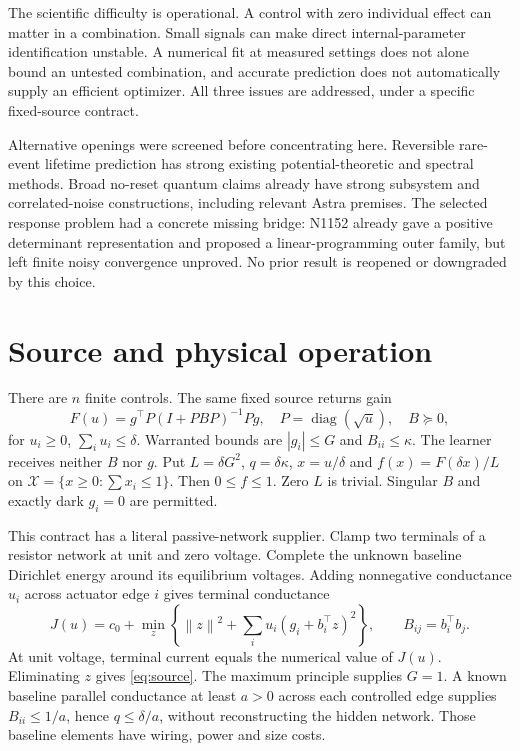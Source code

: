 \documentclass[10pt,a4paper]{article}
\newcommand{\X}{\mathcal X}
\newcommand{\norm}[1]{\left\lVert#1\right\rVert}
\begin{document}
The scientific difficulty is operational. A control with zero individual effect
can matter in a combination. Small signals can make direct internal-parameter
identification unstable. A numerical fit at measured settings does not alone
bound an untested combination, and accurate prediction does not automatically
supply an efficient optimizer. All three issues are addressed, under a specific
fixed-source contract.

Alternative openings were screened before concentrating here. Reversible
rare-event lifetime prediction has strong existing potential-theoretic and
spectral methods. Broad no-reset quantum claims already have strong subsystem
and correlated-noise constructions, including relevant Astra premises. The
selected response problem had a concrete missing bridge: N1152 already gave a
positive determinant representation and proposed a linear-programming outer
family, but left finite noisy convergence unproved. No prior result is reopened
or downgraded by this choice.

\section{Source and physical operation}

There are $n$ finite controls. The same fixed source returns gain
\begin{equation}
 F(u)=g^\top P(I+PBP)^{-1}Pg,\quad P=\operatorname{diag}(\sqrt u),\quad
 B\succeq0,
 \label{eq:source}
\end{equation}
for $u_i\ge0$, $\sum_i u_i\le\delta$. Warranted bounds are
$|g_i|\le G$ and $B_{ii}\le\kappa$. The learner receives neither $B$ nor $g$.
Put $L=\delta G^2$, $q=\delta\kappa$, $x=u/\delta$ and
$f(x)=F(\delta x)/L$ on $\X=\{x\ge0:\sum x_i\le1\}$. Then $0\le f\le1$.
Zero $L$ is trivial. Singular $B$ and exactly dark $g_i=0$ are permitted.

This contract has a literal passive-network supplier. Clamp two terminals of a
resistor network at unit and zero voltage. Complete the unknown baseline
Dirichlet energy around its equilibrium voltages. Adding nonnegative conductance
$u_i$ across actuator edge $i$ gives terminal conductance
\begin{equation}
 J(u)=c_0+\min_z\left\{\norm z^2+\sum_i u_i(g_i+b_i^\top z)^2\right\},
 \qquad B_{ij}=b_i^\top b_j.
 \label{eq:energy}
\end{equation}
At unit voltage, terminal current equals the numerical value of $J(u)$.
Eliminating $z$ gives \eqref{eq:source}. The maximum principle supplies $G=1$.
A known baseline parallel conductance at least $a>0$ across each controlled
edge supplies $B_{ii}\le1/a$, hence $q\le\delta/a$, without reconstructing the
hidden network. Those baseline elements have wiring, power and size costs.
\end{document}
